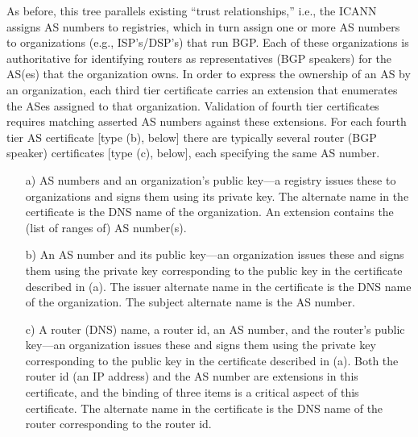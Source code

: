 \documentclass[12pt]{article}
\begin{document}
\begin{description}
As before, this tree parallels existing “trust relationships,”
i.e., the ICANN assigns AS numbers to registries, which in
turn assign one or more AS numbers to organizations (e.g.,
ISP’s/DSP’s) that run BGP. Each of these organizations is
authoritative for identifying routers as representatives (BGP
speakers) for the AS(es) that the organization owns. In order
to express the ownership of an AS by an organization, each
third tier certificate carries an extension that enumerates the
ASes assigned to that organization. Validation of fourth tier
certificates requires matching asserted AS numbers against
these extensions. For each fourth tier AS certificate [type (b),
below] there are typically several router (BGP speaker) certificates [type (c), below], each specifying the same AS number.
\begin{itemize}
\item[a)] AS numbers and an organization's public key—a registry
issues these to organizations and signs them using its private key. The alternate name in the certificate is the DNS
name of the organization. An extension contains the (list
of ranges of) AS number(s).
\item[b)] An AS number and its public key—an organization issues
these and signs them using the private key corresponding
to the public key in the certificate described in (a). The
issuer alternate name in the certificate is the DNS name
of the organization. The subject alternate name is the AS
number.
\item[c)] A router (DNS) name, a router id, an AS number, and
the router's public key—an organization issues these and
signs them using the private key corresponding to the
public key in the certificate described in (a). Both the
router id (an IP address) and the AS number are extensions in this certificate, and the binding of three items is a
critical aspect of this certificate. The alternate name in the
certificate is the DNS name of the router corresponding to
the router id.
\end{itemize}
\end{description}
\end{document}
